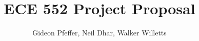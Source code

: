\documentclass[letterpaper]{article}
\begin{document}
\title{ECE 552 Project Proposal}
\author{Gideon Pfeffer, Neil Dhar, Walker Willetts}
\date{}
\maketitle
\end{document}
